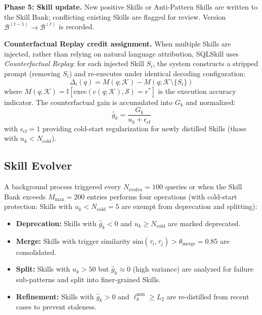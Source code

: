\textbf{Phase 5: Skill update.} New positive Skills or Anti-Pattern Skills are written to the Skill Bank; conflicting existing Skills are flagged for review. Version $\mathcal{B}^{(t-1)} \to \mathcal{B}^{(t)}$ is recorded.

\textbf{Counterfactual Replay credit assignment.} When multiple Skills are injected, rather than relying on natural language attribution, SQLSkill uses \emph{Counterfactual Replay}: for each injected Skill $S_i$, the system constructs a stripped prompt (removing $S_i$) and re-executes under identical decoding configuration:
\begin{equation}
  \Delta_i(q) = M(q; \mathcal{K}) - M(q; \mathcal{K} \setminus \{S_i\})
\end{equation}
where $M(q; \mathcal{K}) = \mathbb{I}[\text{exec}(c(q; \mathcal{K}), \mathcal{S}) = r^*]$ is the execution accuracy indicator. The counterfactual gain is accumulated into $G_k$ and normalized:
\begin{equation}
  \hat{g}_k = \frac{G_k}{u_k + \epsilon_{\text{cf}}}
\end{equation}
with $\epsilon_{\text{cf}} = 1$ providing cold-start regularization for newly distilled Skills (those with $u_k < N_{\text{cold}}$).

\subsection{Skill Evolver}
\label{subsec:evolver}

A background process triggered every $N_{\text{evolve}}=100$ queries or when the Skill Bank exceeds $M_{\text{max}}=200$ entries performs four operations (with cold-start protection: Skills with $u_k < N_{\text{cold}} = 5$ are exempt from deprecation and splitting):
\begin{itemize}
  \item \textbf{Deprecation:} Skills with $\hat{g}_k < 0$ and $u_k \geq N_{\text{cold}}$ are marked deprecated.
  \item \textbf{Merge:} Skills with trigger similarity $\text{sim}(\tau_i, \tau_j) > \theta_{\text{merge}} = 0.85$ are consolidated.
  \item \textbf{Split:} Skills with $u_k > 50$ but $\hat{g}_k \approx 0$ (high variance) are analyzed for failure sub-patterns and split into finer-grained Skills.
  \item \textbf{Refinement:} Skills with $\hat{g}_k > 0$ and $\ell_k^{\min} \geq L_2$ are re-distilled from recent cases to prevent staleness.
\end{itemize}

